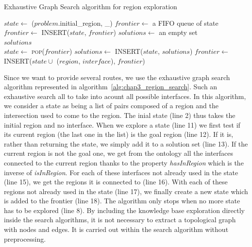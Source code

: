\begin{algorithm}[!htb]
\caption{Exhaustive Graph Search algorithm for region exploration}
\label{alg:chap3_region_search}
\begin{algorithmic}[1]
	\State $state \leftarrow$ ($problem$.initial\_region, \_) 
    \State $frontier\leftarrow$ a FIFO queue of state
    \State $frontier\leftarrow$ \textsc{INSERT}($state$, $frontier$)
    \State $solutions\leftarrow$ an empty set
    \\
    \Loop
        	\State \Return $solutions$
        \EndIf
        \\
        \State $state\leftarrow$ \textsc{pop}($frontier$)
        	\State $solutions\leftarrow$ \textsc{INSERT}($state$, $solutions$)
        \Else
        				\State $frontier\leftarrow$ \textsc{INSERT}($state \cup$ ($region$, $interface$), $frontier$)
        			\EndIf
        		\EndFor
        	\EndFor
        \EndIf
    \EndLoop
\EndFunction
\end{algorithmic}
\end{algorithm}

Since we want to provide several routes, we use the exhaustive graph search algorithm represented in algorithm~\ref{alg:chap3_region_search}. Such an exhaustive search all to take into acount all possible interfaces. In this algorithm, we consider a state as being a list of pairs composed of a region and the intersection used to come to the region. The inial state (line 2) thus takes the initial region and no interface. When we explore a state (line 11) we first test if its current region (the last one in the list) is the goal region (line 12). If it is, rather than returning the state, we simply add it to a solution set (line 13). If the current region is not the goal one, we get from the ontology all the interfaces connected to the current region thanks to the property \textit{hasInRegion} which is the inverse of \textit{isInRegion}. For each of these interfaces not already used in the state (line 15), we get the regions it is connected to (line 16). With each of these regions not already used in the state (line 17), we finally create a new state which is added to the frontier (line 18). The algorithm only stops when no more state has to be explored (line 8). By including the knowledge base exploration directly inside the search algorithms, it is not necessary to extract a topological graph with nodes and edges. It is carried out within the search algorithm without preprocessing.

